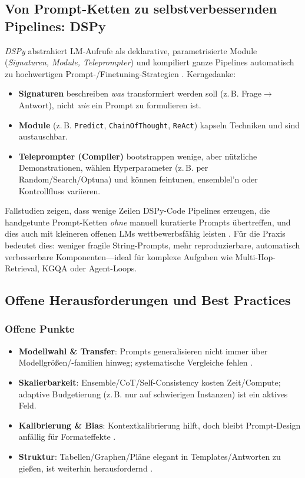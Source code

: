\subsection{Von Prompt-Ketten zu selbstverbessernden Pipelines: DSPy}
\emph{DSPy} abstrahiert LM-Aufrufe als deklarative, parametrisierte Module (\emph{Signaturen, Module, Teleprompter}) und kompiliert ganze Pipelines automatisch zu hochwertigen Prompt-/Finetuning-Strategien \cite{khattab2023dspy}. Kerngedanke:
\begin{itemize}
  \item \textbf{Signaturen} beschreiben \emph{was} transformiert werden soll (z.\,B. Frage\(\rightarrow\)Antwort), nicht \emph{wie} ein Prompt zu formulieren ist.
  \item \textbf{Module} (z.\,B. \texttt{Predict}, \texttt{ChainOfThought}, \texttt{ReAct}) kapseln Techniken und sind austauschbar.
  \item \textbf{Teleprompter (Compiler)} bootstrappen wenige, aber nützliche Demonstrationen, wählen Hyperparameter (z.\,B. per Random/Search/Optuna) und können feintunen, ensemblel'n oder Kontrollfluss variieren.
\end{itemize}
Fallstudien zeigen, dass wenige Zeilen DSPy-Code Pipelines erzeugen, die handgetunte Prompt-Ketten \emph{ohne} manuell kuratierte Prompts übertreffen, und dies auch mit kleineren offenen LMs wettbewerbsfähig leisten \cite{khattab2023dspy}. Für die Praxis bedeutet dies: weniger fragile String-Prompts, mehr reproduzierbare, automatisch verbesserbare Komponenten—ideal für komplexe Aufgaben wie Multi-Hop-Retrieval, KGQA oder Agent-Loops.

\subsection{Offene Herausforderungen und Best Practices}
\subsubsection*{Offene Punkte}
\begin{itemize}
  \item \textbf{Modellwahl \& Transfer}: Prompts generalisieren nicht immer über Modellgrößen/-familien hinweg; systematische Vergleiche fehlen \cite{liu2023survey}.
  \item \textbf{Skalierbarkeit}: Ensemble/CoT/Self-Consistency kosten Zeit/Compute; adaptive Budgetierung (z.\,B. nur auf schwierigen Instanzen) ist ein aktives Feld.
  \item \textbf{Kalibrierung \& Bias}: Kontextkalibrierung hilft, doch bleibt Prompt-Design anfällig für Formateffekte \cite{zhao2021calibrate}.
  \item \textbf{Struktur}: Tabellen/Graphen/Pläne elegant in Templates/Antworten zu gießen, ist weiterhin herausfordernd \cite{liu2023survey}.
\end{itemize}

